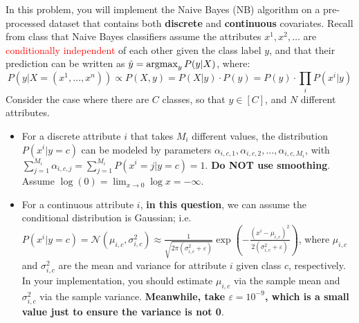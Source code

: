 \documentclass{article}
\begin{document}
In this problem, you will implement the Naive Bayes (NB) algorithm on a pre-processed dataset that contains both \textbf{discrete} and \textbf{continuous} covariates. Recall from class that Naive Bayes classifiers assume the attributes $x^1, x^2, \dots$ are \textcolor{red}{conditionally independent} of each other given the class label $y$, and that their prediction can be written as $\hat{y} = \operatorname*{\mathrm{argmax}}_y P(y|X)$, where:
\begin{equation}\label{naive-bayes-1}
P(y|X=(x^1, \dots, x^n)) \propto P(X, y) = P(X|y) \cdot P(y) = P(y) \cdot \prod_i P(x^i|y)
\end{equation}
Consider the case where there are $C$ classes, so that $y \in [C]$, and $N$ different attributes. 
\begin{itemize}
\item For a discrete attribute $i$ that takes $M_i$ different values, the distribution $P(x^i|y=c)$ can be modeled by parameters $\alpha_{i, c, 1}, \alpha_{i, c, 2}, \dots, \alpha_{i, c, M_i}$, with $\sum_{j=1}^{M_i} \alpha_{i, c, j} = \sum_{j=1}^{M_i} P(x^i=j| y=c) = 1$. \textbf{Do NOT use smoothing}. Assume $\log(0) = \lim_{x \rightarrow 0} \log x = -\infty$.

\item For a continuous attribute $i$, \textbf{in this question}, we can assume the conditional distribution is Gaussian; i.e. $P(x^i|y=c) = \mathcal{N}(\mu_{i, c}, \sigma_{i, c}^2)\approx\frac{1}{\sqrt{2\pi(\sigma_{i,c}^2+\varepsilon)}} \exp(-\frac{(x^i-\mu_{i,c})^2}{2(\sigma_{i,c}^2+\varepsilon)})$, where $\mu_{i,c}$ and $\sigma_{i,c}^2$ are the mean and variance for attribute $i$ given class $c$, respectively. In your implementation, you should estimate $\mu_{i,c}$ via the sample mean and $\sigma_{i,c}^2$ via the sample variance. \textbf{Meanwhile, take $\varepsilon=10^{-9}$, which is a small value just to ensure the variance is not 0}.
\end{itemize}
\end{document}
